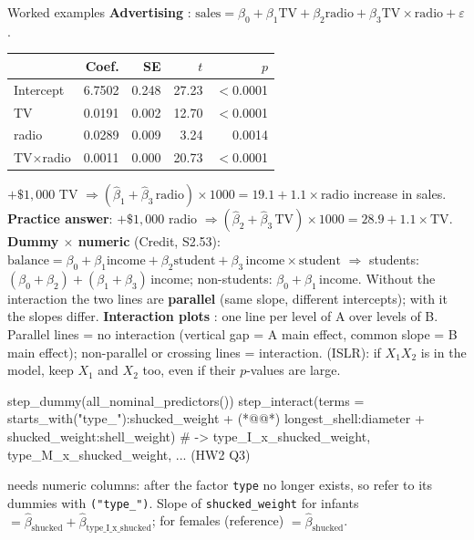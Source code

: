 \begin{topic}{Worked examples}
\textbf{Advertising} : $\text{sales}=\beta_0+\beta_1\text{TV}+\beta_2\text{radio}+\beta_3\text{TV}\times\text{radio}+\varepsilon$.
\begin{center}{\small\begin{tabular}{@{}l r r r r@{}}\toprule
& Coef. & SE & $t$ & $p$\\\midrule
Intercept & 6.7502 & 0.248 & 27.23 & $<$0.0001\\
TV & 0.0191 & 0.002 & 12.70 & $<$0.0001\\
radio & 0.0289 & 0.009 & 3.24 & 0.0014\\
TV$\times$radio & 0.0011 & 0.000 & 20.73 & $<$0.0001\\\bottomrule
\end{tabular}}\end{center}
$+\$1{,}000$ TV $\Rightarrow (\hat\beta_1+\hat\beta_3\,\text{radio})\times1000=19.1+1.1\times\text{radio}$ increase in sales. \textbf{Practice answer}: $+\$1{,}000$ radio $\Rightarrow(\hat\beta_2+\hat\beta_3\,\text{TV})\times1000=28.9+1.1\times\text{TV}$.
\textbf{Dummy $\times$ numeric} (Credit, S2.53): $\text{balance}=\beta_0+\beta_1\text{income}+\beta_2\text{student}+\beta_3\,\text{income}\times\text{student}$ $\Rightarrow$ students: $(\beta_0+\beta_2)+(\beta_1+\beta_3)\,$income; non-students: $\beta_0+\beta_1\,$income. Without the interaction the two lines are \textbf{parallel} (same slope, different intercepts); with it the slopes differ.
\textbf{Interaction plots} : one line per level of A over levels of B. Parallel lines = no interaction (vertical gap = A main effect, common slope = B main effect); non-parallel or crossing lines = interaction.
\textbf{} (ISLR): if $X_1X_2$ is in the model, keep $X_1$ and $X_2$ too, even if their $p$-values are large.
\end{topic}

\begin{rcode}
step_dummy(all_nominal_predictors()) %
step_interact(terms = ~ starts_with("type_"):shucked_weight +  (*@@*)
                longest_shell:diameter + shucked_weight:shell_weight)
# -> type_I_x_shucked_weight, type_M_x_shucked_weight, ...   (HW2 Q3)
\end{rcode}
 needs numeric columns: after  the factor \texttt{type} no longer exists, so refer to its dummies with \texttt{("type\_")}. Slope of \texttt{shucked\_weight} for infants $=\hat\beta_{\text{shucked}}+\hat\beta_{\text{type\_I\_x\_shucked}}$; for females (reference) $=\hat\beta_{\text{shucked}}$.


